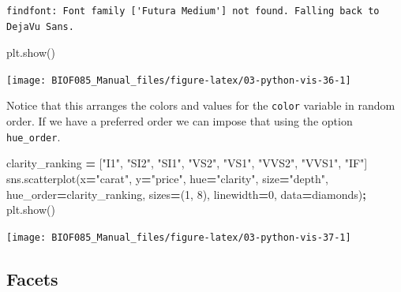 \documentclass[
  letterpaper,
]{scrbook}
\newenvironment{Shaded}{\begin{snugshade}}{\end{snugshade}}
\newcommand{\DecValTok}[1]{\textcolor[rgb]{0.00,0.00,0.81}{#1}}
\newcommand{\NormalTok}[1]{#1}
\newcommand{\OperatorTok}[1]{\textcolor[rgb]{0.81,0.36,0.00}{\textbf{#1}}}
\newcommand{\StringTok}[1]{\textcolor[rgb]{0.31,0.60,0.02}{#1}}
\begin{document}
\begin{verbatim}
findfont: Font family ['Futura Medium'] not found. Falling back to DejaVu Sans.
\end{verbatim}

\begin{Shaded}
\begin{Highlighting}[]
\NormalTok{plt.show()}
\end{Highlighting}
\end{Shaded}

\begin{center}\texttt{[image: BIOF085\_Manual\_files/figure-latex/03-python-vis-36-1]} \end{center}

Notice that this arranges the colors and values for the \texttt{color} variable in random order. If we have a preferred order we can impose that using the option \texttt{hue\_order}.

\begin{Shaded}
\begin{Highlighting}[]
\NormalTok{clarity_ranking }\OperatorTok{=}\NormalTok{ [}\StringTok{"I1"}\NormalTok{, }\StringTok{"SI2"}\NormalTok{, }\StringTok{"SI1"}\NormalTok{, }\StringTok{"VS2"}\NormalTok{, }\StringTok{"VS1"}\NormalTok{, }\StringTok{"VVS2"}\NormalTok{, }\StringTok{"VVS1"}\NormalTok{, }\StringTok{"IF"}\NormalTok{]}
\NormalTok{sns.scatterplot(x}\OperatorTok{=}\StringTok{"carat"}\NormalTok{, y}\OperatorTok{=}\StringTok{"price"}\NormalTok{,}
\NormalTok{                hue}\OperatorTok{=}\StringTok{"clarity"}\NormalTok{, size}\OperatorTok{=}\StringTok{"depth"}\NormalTok{,}
\NormalTok{                hue_order}\OperatorTok{=}\NormalTok{clarity_ranking,}
\NormalTok{                sizes}\OperatorTok{=}\NormalTok{(}\DecValTok{1}\NormalTok{, }\DecValTok{8}\NormalTok{), linewidth}\OperatorTok{=}\DecValTok{0}\NormalTok{,}
\NormalTok{                data}\OperatorTok{=}\NormalTok{diamonds)}\OperatorTok{;}
\NormalTok{plt.show() }
\end{Highlighting}
\end{Shaded}

\begin{center}\texttt{[image: BIOF085\_Manual\_files/figure-latex/03-python-vis-37-1]} \end{center}

\hypertarget{facets}{%
\subsection{Facets}\label{facets}}
\end{document}
